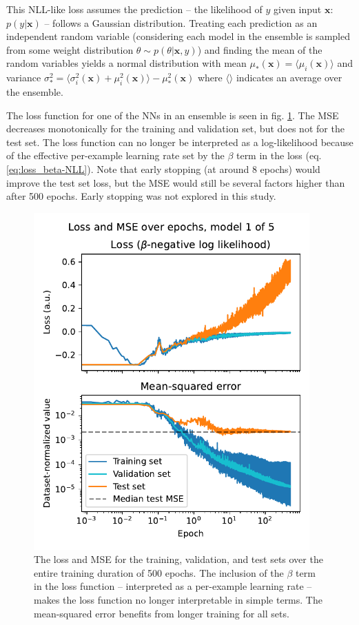 This NLL-like loss assumes the prediction -- the likelihood of $y$ given input $\mathbf{x}$: $p(y|\mathbf{x})$ -- follows a Gaussian distribution. Treating each prediction as an independent random variable (considering each model in the ensemble is sampled from some weight distribution $\theta \sim p(\theta | \mathbf{x}, y)$) and finding the mean of the random variables yields a normal distribution with mean $\mu_* (\mathbf{x}) = \langle \mu_i(\mathbf{x}) \rangle $ and variance $\sigma^2_* = \langle \sigma^2_i(\mathbf{x}) + \mu^2_i(\mathbf{x}) \rangle - \mu^2_* (\mathbf{x})$ where $\langle \rangle$ indicates an average over the ensemble.

The loss function for one of the NNs in an ensemble is seen in fig. \ref{fig:beta-NLL_loss-mse}. The MSE decreases monotonically for the training and validation set, but does not for the test set. The loss function can no longer be interpreted as a log-likelihood because of the effective per-example learning rate set by the $\beta$ term in the loss (eq. \ref{eq:loss_beta-NLL}). Note that early stopping (at around 8 epochs) would improve the test set loss, but the MSE would still be several factors higher than after 500 epochs. Early stopping was not explored in this study.

\begin{figure}
	\centering
	\includegraphics[width=300pt]{figures/beta-NLL_loss-mse.pdf}
	\caption[The loss and MSE for the training, validation, and test sets]{\label{fig:beta-NLL_loss-mse}The loss and MSE for the training, validation, and test sets over the entire training duration of 500 epochs. The inclusion of the $\beta$ term in the loss function -- interpreted as a per-example learning rate -- makes the loss function no longer interpretable in simple terms. The mean-squared error benefits from longer training for all sets.}
\end{figure}

